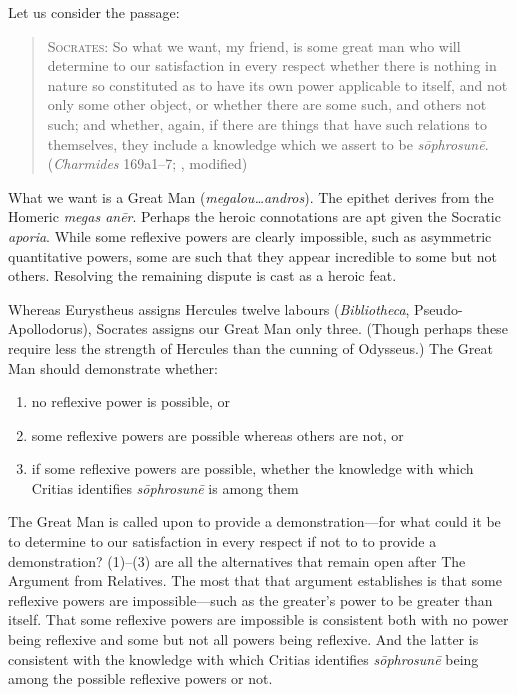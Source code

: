 Let us consider the passage:
\begin{quote}
	\textsc{Socrates}: So what we want, my friend, is some great man who will determine to our satisfaction in every respect whether there is nothing in nature so constituted as to have its own power applicable to itself, and not only some other object, or whether there are some such, and others not such; and whether, again, if there are things that have such relations to themselves, they include a knowledge which we assert to be \emph{sōphrosunē}. (\emph{Charmides} 169a1–7; \citealt[63–5]{Lamb:1927qw}, modified)
\end{quote}
What we want is a Great Man (\emph{megalou\ldots andros}). The epithet derives from the Homeric \emph{megas anēr}. Perhaps the  heroic connotations are apt given the Socratic \emph{aporia}. While some reflexive powers are clearly impossible, such as asymmetric quantitative powers, some are such that they appear incredible to some but not others. Resolving the remaining dispute is cast as a heroic feat. 

Whereas Eurystheus assigns Hercules twelve labours (\emph{Bibliotheca}, Pseudo-Apol\-lo\-dorus), Socrates assigns our Great Man only three. (Though perhaps these require less the strength of Hercules than the cunning of Odysseus.) The Great Man should demonstrate whether:
\begin{enumerate}[(1)]
	\item no reflexive power is possible, or
	\item some reflexive powers are possible whereas others are not, or
	\item if some reflexive powers are possible, whether the knowledge with which Critias identifies \emph{sōphrosunē} is among them
\end{enumerate}
The Great Man is called upon to provide a demonstration—for what could it be to determine to our satisfaction in every respect if not to to provide a demonstration? (1)–(3) are all the alternatives that remain open after The Argument from Relatives. The most that that argument establishes is that some reflexive powers are impossible—such as the greater's power to be greater than itself. That some reflexive powers are impossible is consistent both with no power being reflexive and some but not all powers being reflexive. And the latter is consistent with the knowledge with which Critias identifies \emph{sōphrosunē} being among the possible reflexive powers or not.

